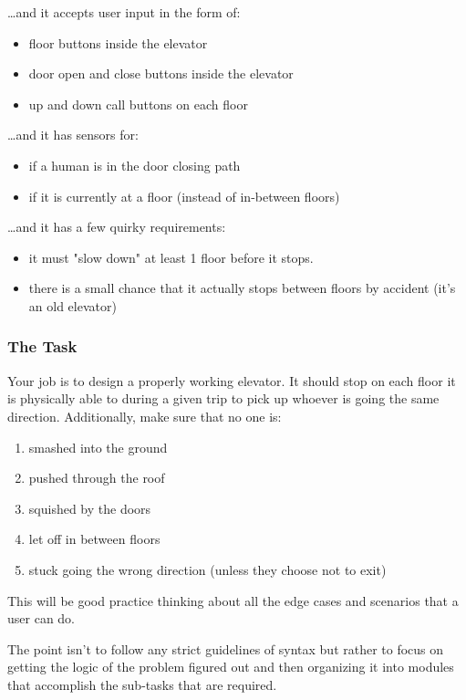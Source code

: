 \documentclass[11pt]{article}
\begin{document}
\ldots{}and it accepts user input in the form of:

\begin{itemize}
\item floor buttons inside the elevator
\item door open and close buttons inside the elevator
\item up and down call buttons on each floor
\end{itemize}


\ldots{}and it has sensors for:

\begin{itemize}
\item if a human is in the door closing path
\item if it is currently at a floor (instead of in-between floors)
\end{itemize}


\ldots{}and it has a few quirky requirements:

\begin{itemize}
\item it must "slow down" at least 1 floor before it stops.
\item there is a small chance that it actually stops between floors by 
accident (it's an old elevator)
\end{itemize}

\subsubsection{The Task}
\label{sec-12-1-2}

Your job is to design a properly working elevator. It should stop on each 
floor it is physically able to during a given trip to pick up whoever is 
going the same direction. Additionally, make sure that no one is:

\begin{enumerate}
\item smashed into the ground
\item pushed through the roof
\item squished by the doors
\item let off in between floors
\item stuck going the wrong direction (unless they choose not to exit)
\end{enumerate}


This will be good practice thinking about all the edge cases and scenarios 
that a user can do.

The point isn't to follow any strict guidelines of syntax but rather to 
focus on getting the logic of the problem figured out and then organizing it
into modules that accomplish the sub-tasks that are required.
\end{document}
